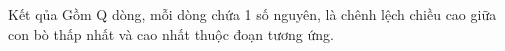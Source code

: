 Kết qủa
Gồm Q dòng, mỗi dòng chứa 1 số nguyên, là chênh lệch chiều cao giữa con bò thấp nhất và cao nhất thuộc đoạn tương ứng.